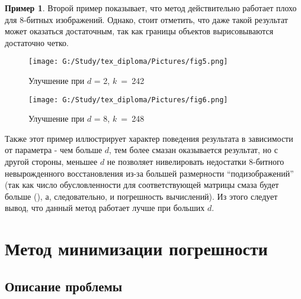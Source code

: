 \documentclass[a4paper]{article}
\theoremstyle{definition}
\newtheorem{example}{Пример}[section]
\begin{document}
\begin{example}

Второй пример показывает, что метод действительно работает плохо для 8-битных изображений. Однако, стоит отметить, что даже такой результат может оказаться достаточным, так как границы объектов вырисовываются достаточно четко.

\hspace*{-\parindent}
\begin{minipage}{80mm}
    \begin{figure}[H]
            \texttt{[image: G:/Study/tex\_diploma/Pictures/fig5.png]}
            \label{Fig3}
            \caption[Улучшение при $d$ = 2, $k$~=~242]{Улучшение при $d$ = 2, $k$~=~242}
        \end{figure}
\end{minipage}
\begin{minipage}{80mm}
  \begin{figure}[H]
            \texttt{[image: G:/Study/tex\_diploma/Pictures/fig6.png]}
            \label{Fig4}
            \caption[Улучшение при $d$ = 8, $k$~=~248]{Улучшение при $d$ = 8, $k$~=~248}
        \end{figure}
\end{minipage}
\hfill

\vspace*{5mm}


Также этот пример иллюстрирует характер поведения результата в зависимости от параметра - чем больше $d$, тем более смазан оказывается результат, но с другой стороны, меньшее $d$ не позволяет нивелировать недостатки 8-битного невырожденного восстановления из-за большей размерности ``подизображений'' (так как число обусловленности для соответствующей матрицы смаза будет больше (\cite{cond}), а, следовательно, и погрешность вычислений). Из этого следует вывод, что данный метод работает лучше при больших $d$.

\end{example}


    \newpage


    \section{Метод минимизации погрешности}

    \subsection{Описание проблемы}
\end{document}
